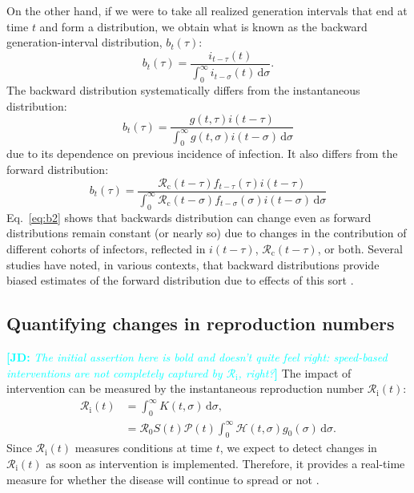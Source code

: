 \documentclass[12pt]{article}
\newcommand{\comment}{\showcomment}
\newcommand{\showcomment}[3]{\textcolor{#1}{\textbf{[#2: }\textsl{#3}\textbf{]}}}
\newcommand{\jd}[1]{\comment{cyan}{JD}{#1}}
\newcommand{\eref}[1]{Eq.~\ref{eq:#1}}
\newcommand{\Rx}[1]{\ensuremath{{\mathcal R}_{#1}}\xspace}
\newcommand{\Rc}{\Rx{\mathrm{c}}}
\newcommand{\Ri}{\Rx{\mathrm{i}}}
\newcommand{\RR}{\ensuremath{{\mathcal R}}\xspace}
\newcommand{\dd}[1]{\ensuremath{\, \mathrm{d}#1}}
\newcommand{\dsigma}{\dd{\sigma}}
\newcommand{\PP}{\ensuremath{\mathcal P}}
\newcommand{\HH}{\ensuremath{\mathcal H}}
\begin{document}
On the other hand, if we were to take all realized generation intervals that end at time $t$ and form a distribution, we obtain what is known as the backward generation-interval distribution, $b_t(\tau)$:
\begin{equation}
b_t(\tau) = \frac{i_{t-\tau}(t)}{\int_0^\infty i_{t-\sigma}(t) \dsigma}.
\label{eq:backward}
\end{equation}
The backward distribution systematically differs from the instantaneous distribution:
\begin{equation}
b_t(\tau) = \frac{g(t,\tau) i(t-\tau)}{\int_0^\infty g(t,\sigma) i(t-\sigma) \dsigma}
\label{eq:b1}
\end{equation}
due to its dependence on previous incidence of infection.
It also differs from the forward distribution:
\begin{equation}
b_t(\tau) = \frac{\Rc(t-\tau) f_{t-\tau}(\tau) i(t-\tau)}{\int_0^\infty \Rc(t-\sigma) f_{t-\sigma}(\sigma) i(t-\sigma) \dsigma}
\label{eq:b2}
\end{equation}
\eref{b2} shows that backwards distribution can change even as forward distributions remain constant (or nearly so) due to changes in the contribution of different cohorts of infectors, reflected in $i(t-\tau)$, $\Rc(t-\tau)$, or both.
Several studies have noted, in various contexts, that backward distributions provide biased estimates of the forward distribution due to effects of this sort \citep{nishiura2010time,champredon2015intrinsic,park2020inferring,park2020forward}.

\subsection{Quantifying changes in reproduction numbers}

\jd{The initial assertion here is bold and doesn't quite feel right: speed-based interventions are not completely captured by \Ri, right?}
The impact of intervention can be measured by the instantaneous reproduction number $\Ri(t)$:
\begin{align}
\Ri(t) &= \int_0^\infty K(t, \sigma) \dsigma, \\
&= \RR_0 S(t) \PP(t) \int_0^\infty \HH(t,\sigma) g_0(\sigma) \dsigma.
\label{eq:rt}
\end{align}
Since $\Ri(t)$ measures conditions at time $t$, we expect to detect changes in $\Ri(t)$ as soon as intervention is implemented.
Therefore, it provides a real-time measure for whether the disease will continue to spread or not \citep{gostic2020practical}.
\end{document}
